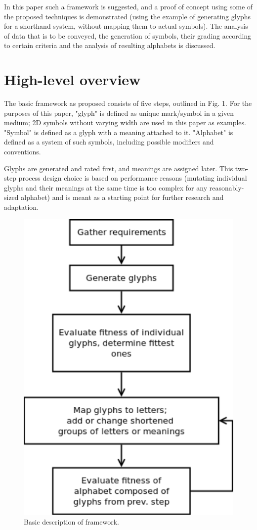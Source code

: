 \documentclass[conference]{IEEEtran}
\begin{document}
In this paper such a framework is suggested, and a proof of concept using some of the proposed techniques is demonstrated (using the example of generating glyphs for a shorthand system, without mapping them to actual symbols). The analysis of data that is to be conveyed, the generation of symbols, their grading according to certain criteria and the analysis of resulting alphabets is discussed.

\section{High-level overview}
The basic framework as proposed consists of five steps, outlined in Fig. 1. For the purposes of this paper, "glyph" is defined as unique mark/symbol in a given medium; 2D symbols without varying width are used in this paper as examples. "Symbol" is defined as a glyph with a meaning attached to it. "Alphabet" is defined as a system of such symbols, including possible modifiers and conventions.

Glyphs are generated and rated first, and meanings are assigned later. This two-step process design choice is based on performance reasons (mutating individual glyphs and their meanings at the same time is too complex for any reasonably-sized alphabet) and is meant as a starting point for further research and adaptation. 

\begin{figure}[tbp]
\centering
        \includegraphics[width=0.75\hsize]{f.pdf}
\caption{Basic description of framework.}
\end{figure}
\end{document}
